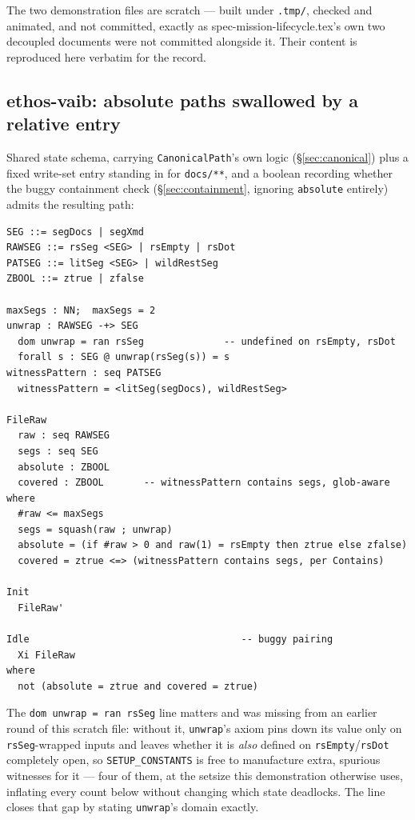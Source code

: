 \documentclass[a4paper,10pt,fleqn]{article}
\newcommand{\fpath}[1]{\texttt{#1}}
\newcommand{\field}[1]{\texttt{#1}}
\begin{document}
The two demonstration files are scratch --- built under
\fpath{.tmp/}, checked and animated, and not committed, exactly as
spec-mission-lifecycle.tex's own two decoupled documents were not
committed alongside it. Their content is reproduced here verbatim
for the record.

\subsection{ethos-vaib: absolute paths swallowed by a relative entry}
\label{sec:validation-vaib}

Shared state schema, carrying \field{CanonicalPath}'s own logic
(\S\ref{sec:canonical}) plus a fixed write-set entry standing in for
\texttt{docs/**}, and a boolean recording whether the buggy
containment check (\S\ref{sec:containment}, ignoring \field{absolute}
entirely) admits the resulting path:

\begin{verbatim}
SEG ::= segDocs | segXmd
RAWSEG ::= rsSeg <SEG> | rsEmpty | rsDot
PATSEG ::= litSeg <SEG> | wildRestSeg
ZBOOL ::= ztrue | zfalse

maxSegs : NN;  maxSegs = 2
unwrap : RAWSEG -+> SEG
  dom unwrap = ran rsSeg              -- undefined on rsEmpty, rsDot
  forall s : SEG @ unwrap(rsSeg(s)) = s
witnessPattern : seq PATSEG
  witnessPattern = <litSeg(segDocs), wildRestSeg>

FileRaw
  raw : seq RAWSEG
  segs : seq SEG
  absolute : ZBOOL
  covered : ZBOOL       -- witnessPattern contains segs, glob-aware
where
  #raw <= maxSegs
  segs = squash(raw ; unwrap)
  absolute = (if #raw > 0 and raw(1) = rsEmpty then ztrue else zfalse)
  covered = ztrue <=> (witnessPattern contains segs, per Contains)

Init
  FileRaw'

Idle                                     -- buggy pairing
  Xi FileRaw
where
  not (absolute = ztrue and covered = ztrue)
\end{verbatim}

The \field{dom unwrap = ran rsSeg} line matters and was missing from
an earlier round of this scratch file: without it, \field{unwrap}'s
axiom pins down its value only on \field{rsSeg}-wrapped inputs and
leaves whether it is \emph{also} defined on \field{rsEmpty}/\field{rsDot}
completely open, so \texttt{SETUP\_CONSTANTS} is free to manufacture
extra, spurious witnesses for it --- four of them, at the setsize this
demonstration otherwise uses, inflating every count below without
changing which state deadlocks. The line closes that gap by stating
\field{unwrap}'s domain exactly.
\end{document}
